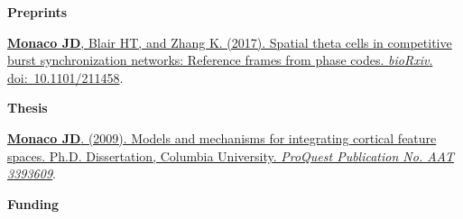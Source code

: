 \documentclass[10pt]{article}
\begin{document}
{\large \textbf{Preprints}}
\begin{description}
\item \href{http://dx.doi.org/10.1101/211458}{\textbf{Monaco JD}, Blair HT, and Zhang K. (2017). Spatial theta cells in competitive burst synchronization networks: Reference frames from phase codes. \emph{bioRxiv}. doi:~10.1101/211458}.
\end{description}

{\large \textbf{Thesis}}

\begin{description}
\item \href{http://search.proquest.com/docview/304862872/abstract}{\textbf{Monaco JD}. (2009). Models and mechanisms for integrating cortical feature spaces. Ph.D. Dissertation, Columbia University. \emph{ProQuest Publication No. AAT 3393609}}.
\end{description}

{\large \textbf{Funding}}
\end{document}
